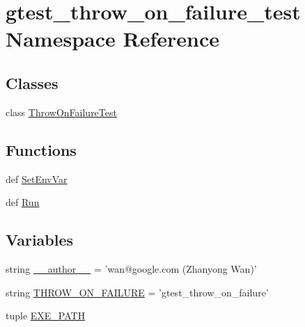 \hypertarget{namespacegtest__throw__on__failure__test}{\section{gtest\-\_\-throw\-\_\-on\-\_\-failure\-\_\-test Namespace Reference}
\label{namespacegtest__throw__on__failure__test}
}
\subsection*{Classes}
\begin{DoxyCompactItemize}
\item 
class \hyperlink{classgtest__throw__on__failure__test_1_1_throw_on_failure_test}{Throw\-On\-Failure\-Test}
\end{DoxyCompactItemize}
\subsection*{Functions}
\begin{DoxyCompactItemize}
\item 
def \hyperlink{namespacegtest__throw__on__failure__test_a0f37f2b5ab8495a3d9390e6faca20723}{Set\-Env\-Var}
\item 
def \hyperlink{namespacegtest__throw__on__failure__test_ad031130c86bd0aa8eee37c09bc7a9000}{Run}
\end{DoxyCompactItemize}
\subsection*{Variables}
\begin{DoxyCompactItemize}
\item 
string \hyperlink{namespacegtest__throw__on__failure__test_afd3c4d4809a79f0b4de8b2372cba5bb8}{\-\_\-\-\_\-author\-\_\-\-\_\-} = 'wan@google.\-com (Zhanyong Wan)'
\item 
string \hyperlink{namespacegtest__throw__on__failure__test_af837d05b7ed8498aed8202c1d83d1e7a}{T\-H\-R\-O\-W\-\_\-\-O\-N\-\_\-\-F\-A\-I\-L\-U\-R\-E} = 'gtest\-\_\-throw\-\_\-on\-\_\-failure'
\item 
tuple \hyperlink{namespacegtest__throw__on__failure__test_a21b57c780e17de8f6aa8c88652b290be}{E\-X\-E\-\_\-\-P\-A\-T\-H}
\end{DoxyCompactItemize}


